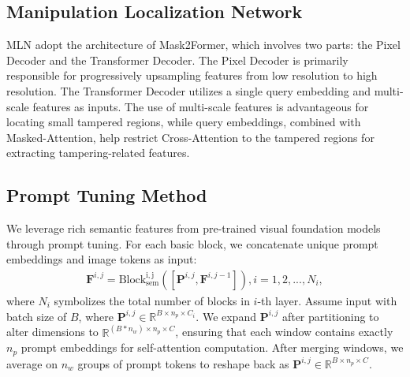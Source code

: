 \documentclass{article}
\begin{document}
\subsection{Manipulation Localization Network}
MLN adopt the architecture of Mask2Former\cite{Mask2Former}, which involves two parts: the Pixel Decoder and the Transformer Decoder. The Pixel Decoder is primarily responsible for progressively upsampling features from low resolution to high resolution. The Transformer Decoder utilizes a single query embedding and multi-scale features as inputs. The use of multi-scale features is advantageous for locating small tampered regions, while query embeddings, combined with Masked-Attention, help restrict Cross-Attention to the tampered regions for extracting tampering-related features.

\subsection{Prompt Tuning Method} 
We leverage rich semantic features from pre-trained visual foundation models through prompt tuning. For each basic block, we concatenate unique prompt embeddings and image tokens as input:
\begin{eqnarray}
\mathbf F^{i,j} = \operatorname{{Block}^{i,j}_{sem}}\left(\left[\mathbf P^{i,j}, \mathbf F^{i,j-1}\right]\right), i=1,2,...,N_i,
\end{eqnarray}
where $N_i$ symbolizes the total number of blocks in $i$-th layer. 
Assume input with batch size of $B$, where $\mathbf P^{i,j} \in \mathbb{R}^{B\times n_p\times C_i}$. We expand $\mathbf P^{i,j}$ after partitioning to alter dimensions to $\mathbb{R}^{(B * n_w)\times n_p\times C}$, ensuring that each window contains exactly $n_p$ prompt embeddings for self-attention computation. After merging windows, we average on $n_w$ groups of prompt tokens to reshape back as $\mathbf P^{i,j} \in \mathbb{R}^{B\times n_p\times C}$.
\end{document}
